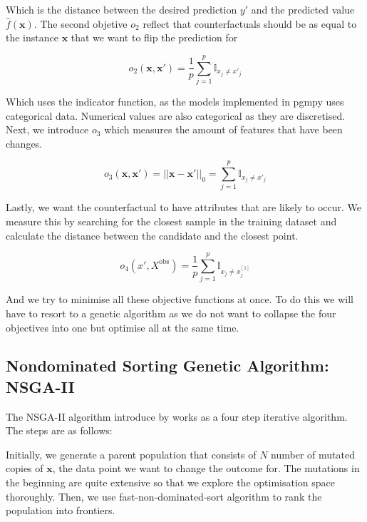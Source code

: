 Which is the distance between the desired prediction $y'$ and the predicted value $\hat{f}(\boldsymbol{x})$.  The second objetive $o_2$ reflect that counterfactuals should be as equal to the instance $\boldsymbol{x}$ that we want to flip the prediction for

\begin{equation*}
    o_2(\boldsymbol{x}, \boldsymbol{x'}) = \frac{1}{p} \sum_{j=1}^{p} \mathbb{I}_{x_j \neq x'_j}
 \end{equation*}

Which uses the indicator function,  as the models implemented in pgmpy uses categorical data. Numerical values are also categorical as they are discretised. Next, we introduce $o_3$ which measures the amount of features that have been changes.

\begin{equation*}
    o_3(\boldsymbol{x}, \boldsymbol{x'}) = ||\boldsymbol{x} - \boldsymbol{x'}||_0 = \sum_{j=1}^{p} \mathbb{I}_{x_j \neq x'_j}
\end{equation*}

Lastly, we want the counterfactual to have attributes that are likely to occur. We measure this by searching for the closest sample in the training dataset and calculate the distance between the candidate and the closest point.

\begin{equation*}
    o_4(x', X^\text{obs}) = \frac{1}{p} \sum_{j=1}^{p} \mathbb{I}_{x_j \neq x^{[1]}_j}
\end{equation*}

And we try to minimise all these objective functions at once. To do this we will have to resort to a genetic algorithm as we do not want to collapse the four objectives into one but optimise all at the same time.

\subsection{Nondominated Sorting Genetic Algorithm: NSGA-II}

The NSGA-II algorithm introduce by \citet{Pratap:2002:IEEE.Trans.Evol.Comput.} works as a four step iterative algorithm. The steps are as follows:

Initially, we generate a parent population that consists of $N$ number of mutated copies of $\boldsymbol{x}$, the data point we want to change the outcome for. The mutations in the beginning are quite extensive so that we explore the optimisation space thoroughly. Then, we use fast-non-dominated-sort algorithm \cite[p.~184]{Pratap:2002:IEEE.Trans.Evol.Comput.} to rank the population into frontiers. 

